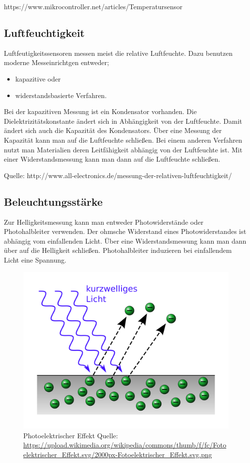 https://www.mikrocontroller.net/articles/Temperatursensor
\subsection{Luftfeuchtigkeit}
\label{sec:Luftfeute}
Luftfeutigkeitssensoren messen meist die relative Luftfeuchte. Dazu benutzen moderne Messeinrichtgen entweder;
\begin{itemize}
\item kapazitive oder 
\item widerstandsbasierte Verfahren.
\end{itemize}
Bei der kapazitiven Messung ist ein Kondensator vorhanden.  Die Dielektrizitätskonstante ändert sich in Abhängigkeit von der Luftfeuchte. Damit ändert sich auch die Kapazität des Kondensators. Über eine Messung der Kapazität kann man auf die Luftfeuchte schließen.
Bei einem anderen Verfahren nutzt man Materialien deren Leitfähigkeit abhängig von der Luftfeuchte ist. Mit einer Widerstandsmessung kann man dann auf die Luftfeuchte schließen.

Quelle: http://www.all-electronics.de/messung-der-relativen-luftfeuchtigkeit/


\subsection{Beleuchtungsstärke}
Zur Helligkeitsmessung kann man entweder Photowiderstände oder Photohalbleiter verwenden. 
Der ohmsche Widerstand eines Photowiderstandes ist abhängig vom einfallenden Licht. Über eine Widerstandsmessung kann man dann über auf die Helligkeit schließen. 
Photohalbleiter induzieren bei einfallendem Licht eine Spannung.

\begin{figure}
\includegraphics[scale=0.1]{bilder/Fotoelektrischer_Effekt} 
\caption{Photoelektrischer Effekt Quelle: \url{https://upload.wikimedia.org/wikipedia/commons/thumb/f/fc/Fotoelektrischer_Effekt.svg/2000px-Fotoelektrischer_Effekt.svg.png}}
\label{Bewegungsmelder}
\end{figure}

